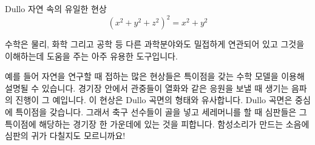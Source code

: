 ﻿\begin{surferPage}{Dullo}
자연 속의 유일한 현상\\
\smallskip
\[(x^2+ y^2+ z^2)^2	= x^2+ y^2\]

\singlespacing
수학은 물리, 화학 그리고 공학 등 다른 과학분야와도 밀접하게 연관되어 있고 그것을 이해하는데 도움을 주는 아주 유용한 도구입니다.

\singlespacing
예를 들어 자연을 연구할 때 접하는 많은 현상들은 특이점을 갖는 수학 모델을 이용해 설명될 수 있습니다. 
\singlespacing
경기장 안에서 관중들이 열화와 같은 응원을 보낼 때 생기는 음파의 진행이 그 예입니다. 이 현상은 Dullo 곡면의 형태와 유사합니다. Dullo 곡면은 중심에 특이점을 갖습니다. 그래서 축구 선수들이 골을 넣고 세레머니를 할 때 심판들은 그 특이점에 해당하는 경기장 한 가운데에 있는 것을 피합니다. 함성소리가 만드는 소음에 심판의 귀가 다칠지도 모르니까요!
\end{surferPage}
